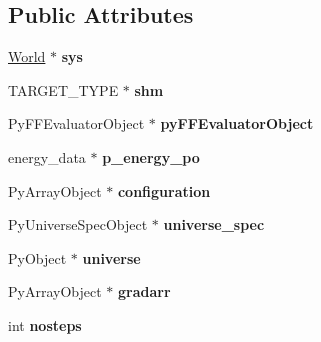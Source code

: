 \subsection*{Public Attributes}
\begin{DoxyCompactItemize}
\item 
\hyperlink{classWorld}{World} $\ast$ {\bfseries sys}\hypertarget{classGCHMCIntegrator_a75299001f5c872307aa2e9eaf65d14a4}{}\label{classGCHMCIntegrator_a75299001f5c872307aa2e9eaf65d14a4}

\item 
T\+A\+R\+G\+E\+T\+\_\+\+T\+Y\+PE $\ast$ {\bfseries shm}\hypertarget{classGCHMCIntegrator_a1f11b96f92bf4e9bb80946fd3a69ae64}{}\label{classGCHMCIntegrator_a1f11b96f92bf4e9bb80946fd3a69ae64}

\item 
Py\+F\+F\+Evaluator\+Object $\ast$ {\bfseries py\+F\+F\+Evaluator\+Object}\hypertarget{classGCHMCIntegrator_a703999d22f28082ab7af71552848a171}{}\label{classGCHMCIntegrator_a703999d22f28082ab7af71552848a171}

\item 
energy\+\_\+data $\ast$ {\bfseries p\+\_\+energy\+\_\+po}\hypertarget{classGCHMCIntegrator_a756f6bdade73958cf355a302000eac5b}{}\label{classGCHMCIntegrator_a756f6bdade73958cf355a302000eac5b}

\item 
Py\+Array\+Object $\ast$ {\bfseries configuration}\hypertarget{classGCHMCIntegrator_ac25dd9aad3833746580d13ccd33e47d4}{}\label{classGCHMCIntegrator_ac25dd9aad3833746580d13ccd33e47d4}

\item 
Py\+Universe\+Spec\+Object $\ast$ {\bfseries universe\+\_\+spec}\hypertarget{classGCHMCIntegrator_acc088ddc60f6e5e24dcc2e6dce58829b}{}\label{classGCHMCIntegrator_acc088ddc60f6e5e24dcc2e6dce58829b}

\item 
Py\+Object $\ast$ {\bfseries universe}\hypertarget{classGCHMCIntegrator_aab32409e10bd4caae145b43e82d8f628}{}\label{classGCHMCIntegrator_aab32409e10bd4caae145b43e82d8f628}

\item 
Py\+Array\+Object $\ast$ {\bfseries gradarr}\hypertarget{classGCHMCIntegrator_aa4be68ee7df1067a9ef8a791a5e4ed3a}{}\label{classGCHMCIntegrator_aa4be68ee7df1067a9ef8a791a5e4ed3a}

\item 
int {\bfseries nosteps}\hypertarget{classGCHMCIntegrator_abb29657d59c4558c7e71e3dfeb869c3c}{}\label{classGCHMCIntegrator_abb29657d59c4558c7e71e3dfeb869c3c}


\end{DoxyCompactItemize}
